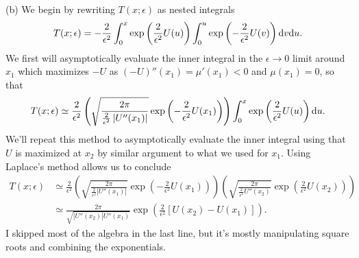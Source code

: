 \documentclass[12pt]{article}
\newcommand{\abs}[1]{ \left| #1 \right| }
\theoremstyle{definition}
\theoremstyle{remark}
\def\d{{\rm d}}
\begin{document}
(b) We begin by rewriting $T(x;\epsilon)$ as nested integrals
\begin{align*}
    T(x;\epsilon) = -\frac{2}{\epsilon^{2}} \int_{0}^{x} \exp \left( \frac{2}{\epsilon^{2}} U(u)\right) \int_{0}^{u}   \exp \left( - \frac{2}{\epsilon^{2}} U(v) \right ) \d v \d u. 
\end{align*}%
We first will asymptotically evaluate the inner integral  in the $\epsilon \to 0$ limit around $x_{1}$ which maximizes $-U$ as $(-U)''(x_{1}) = \mu'(x_{1}) < 0$ and $\mu(x_{1}) = 0$, so that
\begin{align*}
    T(x;\epsilon) \simeq \frac{2}{\epsilon^{2}} \left(  \sqrt{\frac{2\pi}{\frac{2}{\epsilon^{2}} \abs{U''(x_{1})}}}  \exp\left(- \frac{2}{\epsilon^{2}} U(x_{1}) \right)\right)\int_{0}^{x} \exp \left( \frac{2}{\epsilon^{2}} U(u)\right)  \d u.
\end{align*}
We'll repeat this method to asymptotically evaluate the inner integral using that $U$ is maximized at $x_{2}$ by similar argument to what we used for $x_{1}$. Using Laplace's method allows us to conclude
\begin{align*}
    T(x;\epsilon) &\simeq  \frac{2}{\epsilon^{2}} \left(  \sqrt{\frac{2\pi}{\frac{2}{\epsilon^{2}} \abs{U''(x_{1})}}}  \exp\left(- \frac{2}{\epsilon^{2}} U(x_{1}) \right)\right) \left( \sqrt{\frac{2\pi}{\frac{2}{\epsilon^{2}} U''(x_{2})}}  \exp\left(\frac{2}{\epsilon^{2}} U(x_{2}) \right)\right)\\
                  &\simeq \frac{2\pi}{\sqrt{\abs{U''(x_{2})} U''(x_{1})}} \exp\left(\frac{2}{\epsilon^{2}} [U(x_{2}) - U(x_{1})]   \right).
\end{align*}
I skipped most of the algebra in the last line, but it's mostly manipulating square roots and combining the exponentials.
\newpage
\end{document}
